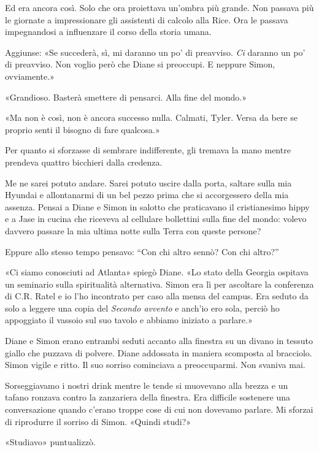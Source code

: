 Ed era ancora così. Solo che ora proiettava un'ombra più grande. Non
passava più le giornate a impressionare gli assistenti di calcolo alla
Rice. Ora le passava impegnandosi a influenzare il corso della storia
umana.

Aggiunse: «Se succederà, sì, mi daranno un po' di preavviso. \emph{Ci}
daranno un po' di preavviso. Non voglio però che Diane si preoccupi. E
neppure Simon, ovviamente.»

«Grandioso. Basterà smettere di pensarci. Alla fine del mondo.»

«Ma non è così, non è ancora successo nulla. Calmati, Tyler. Versa da
bere se proprio senti il bisogno di fare qualcosa.»

Per quanto si sforzasse di sembrare indifferente, gli tremava la mano
mentre prendeva quattro bicchieri dalla credenza.

Me ne sarei potuto andare. Sarei potuto uscire dalla porta, saltare
sulla mia Hyundai e allontanarmi di un bel pezzo prima che si
accorgessero della mia assenza. Pensai a Diane e Simon in salotto che
praticavano il cristianesimo hippy e a Jase in cucina che riceveva al
cellulare bollettini sulla fine del mondo: volevo davvero passare la mia
ultima notte sulla Terra con queste persone?

Eppure allo stesso tempo pensavo: ``Con chi altro sennò? Con chi
altro?''

\separatorefiori

«Ci siamo conosciuti ad Atlanta» spiegò Diane. «Lo stato della Georgia
ospitava un seminario sulla spiritualità alternativa. Simon era lì per
ascoltare la conferenza di C.R. Ratel e io l'ho incontrato per caso alla
mensa del campus. Era seduto da solo a leggere una copia del
\emph{Secondo avvento} e anch'io ero sola, perciò ho appoggiato il
vassoio sul suo tavolo e abbiamo iniziato a parlare.»

Diane e Simon erano entrambi seduti accanto alla finestra su un divano
in tessuto giallo che puzzava di polvere. Diane addossata in maniera
scomposta al bracciolo. Simon vigile e ritto. Il suo sorriso cominciava
a preoccuparmi. Non svaniva mai.

Sorseggiavamo i nostri drink mentre le tende si muovevano alla brezza e
un tafano ronzava contro la zanzariera della finestra. Era difficile
sostenere una conversazione quando c'erano troppe cose di cui non
dovevamo parlare. Mi sforzai di riprodurre il sorriso di Simon. «Quindi
studi?»

«Studiavo» puntualizzò.

